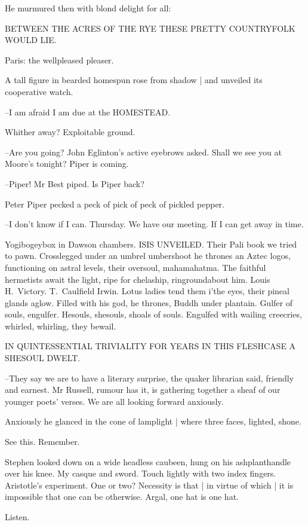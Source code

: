 He murmured then with blond delight for all:


    BETWEEN THE ACRES OF THE RYE
    THESE PRETTY COUNTRYFOLK WOULD LIE.


Paris:
the wellpleased pleaser.

A tall figure in bearded homespun rose from shadow |
and unveiled its cooperative watch.

--I am afraid I am due at the HOMESTEAD.

Whither away?
Exploitable ground.

--Are you going?
John Eglinton's active eyebrows asked.
Shall we see you at Moore's tonight?
Piper is coming.

--Piper!
Mr Best piped.
Is Piper back?

Peter Piper pecked a peck of pick of peck of pickled pepper.

--I don't know if I can.
Thursday.
We have our meeting.
If I can get away in time.

Yogibogeybox in Dawson chambers.
ISIS UNVEILED.
Their Pali book we tried to pawn.
Crosslegged under an umbrel umbershoot
he thrones an Aztec logos,
functioning on astral levels,
their oversoul,
mahamahatma.
The faithful hermetists await the light,
ripe for chelaship,
ringroundabout him.
Louis H.~Victory.
T.~Caulfield Irwin.
Lotus ladies tend them i'the eyes,
their pineal glands aglow.
Filled with his god,
he thrones,
Buddh under plantain.
Gulfer of souls, engulfer.
Hesouls, shesouls, shoals of souls.
Engulfed with wailing creecries,
whirled, whirling, they bewail.


    IN QUINTESSENTIAL TRIVIALITY
    FOR YEARS IN THIS FLESHCASE A SHESOUL DWELT.


--They say we are to have a literary surprise,
the quaker librarian said,
friendly and earnest.
Mr Russell,
rumour has it,
is gathering together a sheaf of our younger poets' verses.
We are all looking forward anxiously.

Anxiously he glanced in the cone of lamplight |
where three faces, lighted, shone.

See this.
Remember.

Stephen looked down on a wide headless caubeen,
hung on his ashplanthandle over his knee.
My casque and sword.
Touch lightly with two index fingers.
Aristotle's experiment.
One or two?
Necessity is that |
in virtue of which |
it is impossible that one can be otherwise.
Argal,
one hat is one hat.

Listen.

